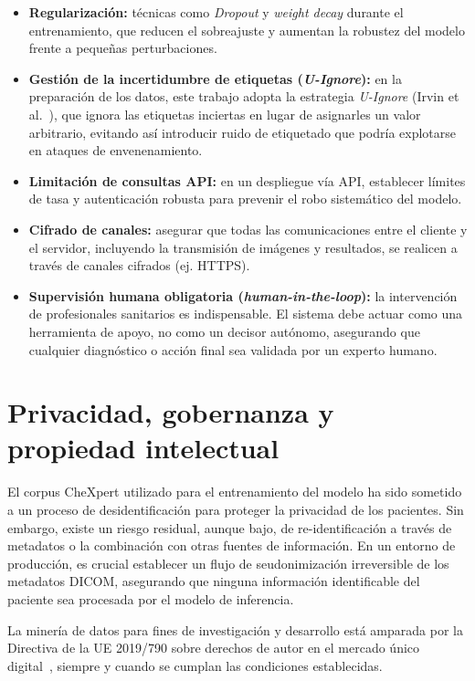\begin{itemize}
    \item \textbf{Regularización:} técnicas como \textit{Dropout} \cite{srivastavaDropout2014} y \textit{weight decay} durante el entrenamiento, que reducen el sobreajuste y aumentan la robustez del modelo frente a pequeñas perturbaciones.
    \item \textbf{Gestión de la incertidumbre de etiquetas (\textit{U-Ignore}):} en la preparación de los datos, este trabajo adopta la estrategia \textit{U-Ignore} (Irvin et al.~\cite{irvinCheXpertLargeChest2019}), que ignora las etiquetas inciertas en lugar de asignarles un valor arbitrario, evitando así introducir ruido de etiquetado que podría explotarse en ataques de envenenamiento.
    \item \textbf{Limitación de consultas API:} en un despliegue vía API, establecer límites de tasa y autenticación robusta para prevenir el robo sistemático del modelo.
    \item \textbf{Cifrado de canales:} asegurar que todas las comunicaciones entre el cliente y el servidor, incluyendo la transmisión de imágenes y resultados, se realicen a través de canales cifrados (ej. HTTPS).
    \item \textbf{Supervisión humana obligatoria (\textit{human-in-the-loop}):} la intervención de profesionales sanitarios es indispensable. El sistema debe actuar como una herramienta de apoyo, no como un decisor autónomo, asegurando que cualquier diagnóstico o acción final sea validada por un experto humano.
\end{itemize}

\section{Privacidad, gobernanza y propiedad intelectual}
El corpus CheXpert \cite{irvinCheXpertLargeChest2019} utilizado para el entrenamiento del modelo ha sido sometido a un proceso de desidentificación para proteger la privacidad de los pacientes. Sin embargo, existe un riesgo residual, aunque bajo, de re-identificación a través de metadatos o la combinación con otras fuentes de información. En un entorno de producción, es crucial establecer un flujo de seudonimización irreversible de los metadatos DICOM, asegurando que ninguna información identificable del paciente sea procesada por el modelo de inferencia.

La minería de datos para fines de investigación y desarrollo está amparada por la Directiva de la UE 2019/790 sobre derechos de autor en el mercado único digital~\cite{euDSMDirective2019}, siempre y cuando se cumplan las condiciones establecidas.

